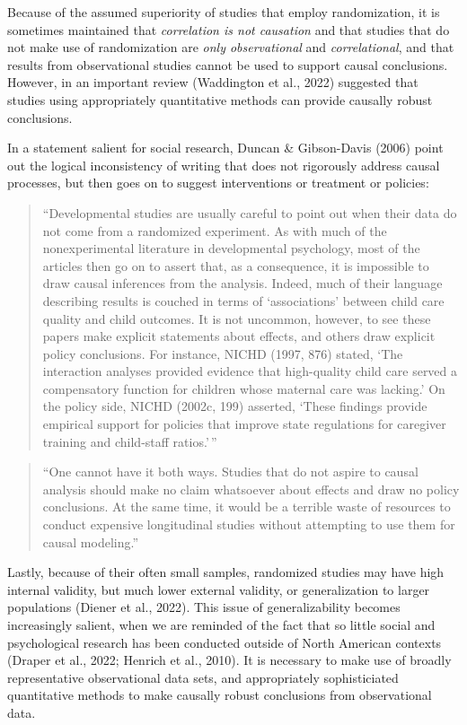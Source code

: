 \documentclass[
  letterpaper,
  DIV=11,
  numbers=noendperiod]{scrreprt}
\begin{document}
Because of the assumed superiority of studies that employ randomization,
it is sometimes maintained that \emph{correlation is not causation} and
that studies that do not make use of randomization are \emph{only
observational} and \emph{correlational}, and that results from
observational studies cannot be used to support causal conclusions.
However, in an important review (Waddington et al., 2022) suggested that
studies using appropriately quantitative methods can provide causally
robust conclusions.

In a statement salient for social research, Duncan \& Gibson-Davis
(2006) point out the logical inconsistency of writing that does not
rigorously address causal processes, but then goes on to suggest
interventions or treatment or policies:

\begin{quote}
``Developmental studies are usually careful to point out when their data
do not come from a randomized experiment. As with much of the
nonexperimental literature in developmental psychology, most of the
articles then go on to assert that, as a consequence, it is impossible
to draw causal inferences from the analysis. Indeed, much of their
language describing results is couched in terms of `associations'
between child care quality and child outcomes. It is not uncommon,
however, to see these papers make explicit statements about effects, and
others draw explicit policy conclusions. For instance, NICHD (1997, 876)
stated, `The interaction analyses provided evidence that high-quality
child care served a compensatory function for children whose maternal
care was lacking.' On the policy side, NICHD (2002c, 199) asserted,
`These findings provide empirical support for policies that improve
state regulations for caregiver training and child-staff ratios.'\,''
\end{quote}

\begin{quote}
``One cannot have it both ways. Studies that do not aspire to causal
analysis should make no claim whatsoever about effects and draw no
policy conclusions. At the same time, it would be a terrible waste of
resources to conduct expensive longitudinal studies without attempting
to use them for causal modeling.''
\end{quote}

Lastly, because of their often small samples, randomized studies may
have high internal validity, but much lower external validity, or
generalization to larger populations (Diener et al., 2022). This issue
of generalizability becomes increasingly salient, when we are reminded
of the fact that so little social and psychological research has been
conducted outside of North American contexts (Draper et al., 2022;
Henrich et al., 2010). It is necessary to make use of broadly
representative observational data sets, and appropriately sophisticiated
quantitative methods to make causally robust conclusions from
observational data.
\end{document}
